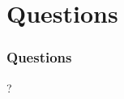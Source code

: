 \documentclass[aspectratio=169]{beamer}
\begin{document}


\section{Questions}

\begin{frame}

  \frametitle{Questions}

  \begin{center}
    {\fontsize{200}{200}\selectfont ?}
  \end{center}
  
\end{frame}

\end{document}
